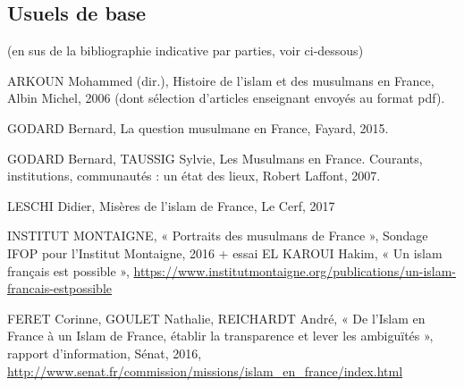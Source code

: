 \subsection{Usuels de base} (en sus de la bibliographie indicative par parties, voir ci-dessous)
\bi
\item ARKOUN Mohammed (dir.), Histoire de l’islam et des musulmans en France, Albin
Michel, 2006 (dont sélection d’articles enseignant envoyés au format pdf).
\item GODARD Bernard, La question musulmane en France, Fayard, 2015.
\item GODARD Bernard, TAUSSIG Sylvie, Les Musulmans en France. Courants,
institutions, communautés : un état des lieux, Robert Laffont, 2007.
\item LESCHI Didier, Misères de l'islam de France, Le Cerf, 2017
\item INSTITUT MONTAIGNE, « Portraits des musulmans de France », Sondage IFOP pour
l’Institut Montaigne, 2016 + essai EL KAROUI Hakim, « Un islam français est
possible », \url{https://www.institutmontaigne.org/publications/un-islam-francais-estpossible}
 \item FERET Corinne, GOULET Nathalie, REICHARDT André, « De l'Islam en France à un
Islam de France, établir la transparence et lever les ambiguïtés », rapport d'information,
Sénat, 2016, \url{http://www.senat.fr/commission/missions/islam_en_france/index.html}
\ei



